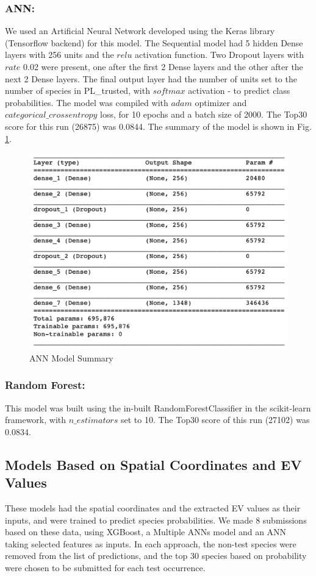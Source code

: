 \documentclass[runningheads]{llncs}
\begin{document}
\subsubsection{ANN:} We used an Artificial Neural Network developed using the Keras library (Tensorflow backend) for this model. The Sequential model had 5 hidden Dense layers with 256 units and the $relu$ activation function. Two Dropout layers with $rate$ 0.02 were present, one after the first 2 Dense layers and the other after the next 2 Dense layers. The final output layer had the number of units set to the number of species in PL\_trusted, with $softmax$ activation - to predict class probabilities. The model was compiled with $adam$ optimizer and $categorical\_crossentropy$ loss, for 10 epochs and a batch size of 2000. The Top30 score for this run (26875) was 0.0844. The summary of the model is shown in Fig. \ref{fig:ann}.
\setlength{\abovecaptionskip}{15pt}
\setlength{\belowcaptionskip}{-22pt}
\begin{figure}[h!]
  \centering
  \includegraphics[scale=0.5]{ann.png}
  \caption{ANN Model Summary}
  \label{fig:ann}
\end{figure}
\subsubsection{Random Forest:} This model was built using the in-built RandomForestClassifier in the scikit-learn framework, with $n\_estimators$ set to 10. The Top30 score of this run (27102) was 0.0834.
\subsection{Models Based on Spatial Coordinates and EV Values}
These models had the spatial coordinates and the extracted EV values as their inputs, and were trained to predict species probabilities. We made 8 submissions based on these data, using XGBoost, a Multiple ANNs model and an ANN taking selected features as inputs. In each approach, the non-test species were removed from the list of predictions, and the top 30 species based on probability were chosen to be submitted for each test occurrence.
\end{document}
